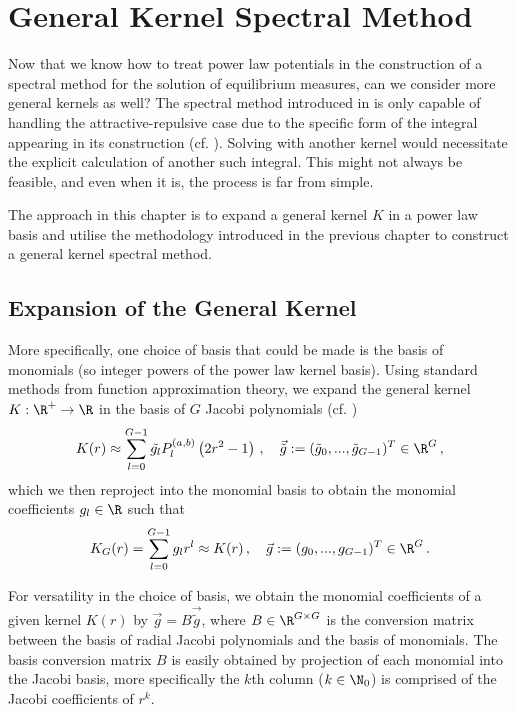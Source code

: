 \chapter{General Kernel Spectral Method}
\label{chap:general-kernel-spectral-method}

Now that we know how to treat power law potentials in the construction of a spectral method for the solution of equilibrium measures, can we consider more general kernels as well?
The spectral method introduced in  is only capable of handling the attractive-repulsive case due to the specific form of the integral appearing in its construction (cf. ).
Solving with another kernel would necessitate the explicit calculation of another such integral.
This might not always be feasible, and even when it is, the process is far from simple.

The approach in this chapter is to expand a general kernel $K$ in a power law basis and utilise the methodology introduced in the previous chapter to construct a general kernel spectral method.

\section{Expansion of the General Kernel}
More specifically, one choice of basis that could be made is the basis of monomials (so integer powers of the power law kernel basis).
Using standard methods from function approximation theory, we expand the general kernel $K: \R^+ \to \R$ in the basis of $G$ Jacobi polynomials (cf. )
$$K(r) \approx \sum_{l=0}^{G-1} \tilde{g_l} P_l^{(a, b)}\left(2 r^2 - 1\right)\,, \quad \vec{\tilde{g}} := (\tilde{g}_0, ..., \tilde{g}_{G-1})^T \in \R^G\,,$$
which we then reproject into the monomial basis to obtain the monomial coefficients $g_l \in \R$ such that
\begin{equation}
  K_G(r) = \sum_{l=0}^{G-1} g_l r^l \approx K(r)\,,\quad \vec{g} := ({g}_0, ..., {g}_{G-1})^T \in \R^G\,.
  \label{eq:monomial-expansion}
\end{equation}

For versatility in the choice of basis, we obtain the monomial coefficients of a given kernel $K(r)$ by $\vec{g} = B \vec{\tilde{g}}$, where $B \in \R^{G \times G}$ is the conversion matrix between the basis of radial Jacobi polynomials and the basis of monomials.
The basis conversion matrix $B$ is easily obtained by projection of each monomial into the Jacobi basis, more specifically the $k$th column ($k \in \N_0$) is comprised of the Jacobi coefficients of $r^{k}$.

